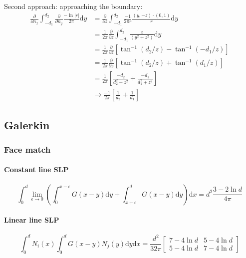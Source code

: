 \documentclass[a4paper,11pt]{article}
\newcommand{\td}{\mathrm{d}}
\begin{document}
Second approach: approaching the boundary:
%
\begin{align}
\frac{\partial}{\partial n_x}
\int_{-d_1}^{d_2} 
\frac{\partial}{\partial n_y}
\frac{-\ln |r|}{2\pi}
\td y 
&=
\frac{\partial}{\partial z}
\int_{-d_1}^{d_2} 
\frac{-1}{2\pi r} \frac{(y, -z) \cdot (0,1)}{r}
\td y \nonumber \\
&=
\frac{1}{2\pi} \frac{\partial}{\partial z}
\int_{-d_1}^{d_2} 
\frac{z}{\left(y^2+z^2\right)}
\td y \nonumber \\
&=
\frac{1}{2\pi} \frac{\partial}{\partial z}
\left[
\tan^{-1}\left(d_2/z\right)
-
\tan^{-1}\left(-d_1/z\right)
\right]
\nonumber \\
&=
\frac{1}{2\pi} \frac{\partial}{\partial z}
\left[
\tan^{-1}\left(d_2/z\right) + \tan^{-1}\left(d_1/z\right)
\right]
\nonumber \\
&=
\frac{1}{2\pi} 
\left[
\frac{-d_2}{d_2^2+z^2} + \frac{-d_1}{d_1^2+z^2}
\right]
\nonumber \\
& \to
\frac{-1}{2\pi} 
\left[
\frac{1}{d_2} + \frac{1}{d_1}
\right]
\end{align}


\subsection{Galerkin}

\subsubsection{Face match}

\paragraph{Constant line SLP}

\begin{equation}
\int_{0}^{d}
\lim_{\epsilon \to 0}
\left(
\int_{0}^{x-\epsilon} G(x-y) \td y
+
\int_{x+\epsilon}^{d} G(x-y) \td y
\right)
\td x
=
d^2\frac{3-2\ln d}{4\pi}
\end{equation}

\paragraph{Linear line SLP}

\begin{equation}
\int_{0}^{d} N_i(x) \int_{0}^{d} G(x-y) N_j(y) \td y \td x
=
\frac{d^2}{32\pi} \begin{bmatrix}
7-4 \ln d & 5 - 4 \ln d \\
5-4 \ln d & 7 - 4 \ln d
\end{bmatrix}
\end{equation}
\end{document}
